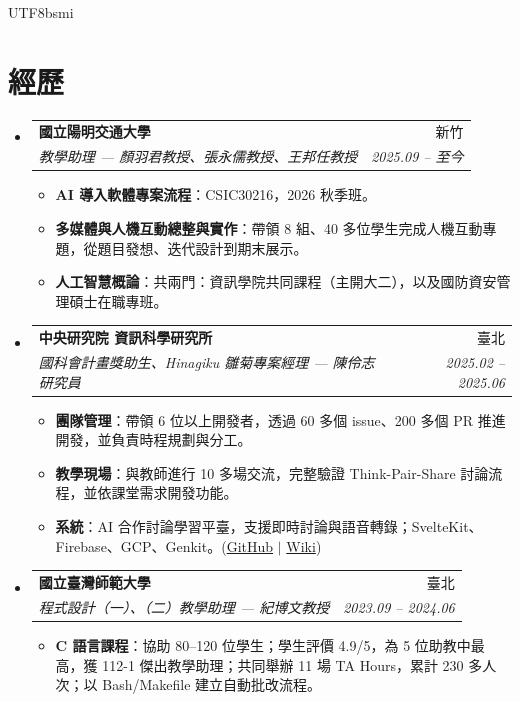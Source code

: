 \documentclass[letterpaper,10pt]{article}
\makeatletter
\newcommand{\resumeItem}[2]{
  \item\small{
    \textbf{#1}{: #2 \vspace{-2pt}}
  }
}
\newcommand{\resumeSubheading}[4]{
  \vspace{-1pt}\item
    \begin{tabular*}{0.97\textwidth}{l@{\extracolsep{\fill}}r}
      \textbf{#1} & #2 \\
      \textit{\small#3} & \textit{\small #4} \\
    \end{tabular*}\vspace{-5pt}
}
\newcommand{\resumeSubHeadingListStart}{\begin{itemize}[leftmargin=*]}
\newcommand{\resumeSubHeadingListEnd}{\end{itemize}}
\newcommand{\resumeItemListStart}{\begin{itemize}}
\newcommand{\resumeItemListEnd}{\end{itemize}\vspace{-5pt}}
\let\origtextbf\textbf
\renewcommand{\textbf}[1]{\origtextbf{\CJKbold #1\CJKnormal}}
\renewcommand{\resumeItem}[2]{
  \item\small{
    \textbf{#1}{：#2\vspace{-2pt}}
  }
}
\makeatother
\begin{document}
\begin{CJK}{UTF8}{bsmi}
\section{經歷}
  \resumeSubHeadingListStart

    \resumeSubheading
      {國立陽明交通大學}{新竹}
      {教學助理 --- 顏羽君教授、張永儒教授、王邦任教授}{2025.09 -- 至今}
      \resumeItemListStart
        \resumeItem{AI 導入軟體專案流程}
          {CSIC30216，2026 秋季班。}
        \resumeItem{多媒體與人機互動總整與實作}
          {帶領 8 組、40 多位學生完成人機互動專題，從題目發想、迭代設計到期末展示。}
        \resumeItem{人工智慧概論}
          {共兩門：資訊學院共同課程（主開大二），以及國防資安管理碩士在職專班。}
      \resumeItemListEnd

    \resumeSubheading
      {中央研究院 資訊科學研究所}{臺北}
      {國科會計畫獎助生、Hinagiku 雛菊專案經理 --- 陳伶志研究員}{2025.02 -- 2025.06}
      \resumeItemListStart
        \resumeItem{團隊管理}
          {帶領 6 位以上開發者，透過 60 多個 issue、200 多個 PR 推進開發，並負責時程規劃與分工。}
        \resumeItem{教學現場}
          {與教師進行 10 多場交流，完整驗證 Think-Pair-Share 討論流程，並依課堂需求開發功能。}
        \resumeItem{系統}
          {AI 合作討論學習平臺，支援即時討論與語音轉錄；SvelteKit、Firebase、GCP、Genkit。(\href{https://github.com/hinagiku-dev/Hinagiku}{GitHub} $|$ \href{https://hackmd.io/@hinagiku/wiki}{Wiki})}
      \resumeItemListEnd

    \resumeSubheading
      {國立臺灣師範大學}{臺北}
      {程式設計（一）、（二）教學助理 --- 紀博文教授}{2023.09 -- 2024.06}
      \resumeItemListStart
        \resumeItem{C 語言課程}
  {協助 80--120 位學生；學生評價 4.9/5，為 5 位助教中最高，獲 112-1 傑出教學助理；共同舉辦 11 場 TA Hours，累計 230 多人次；以 Bash/Makefile 建立自動批改流程。}
      \resumeItemListEnd

  \resumeSubHeadingListEnd


\end{CJK}
\end{document}
